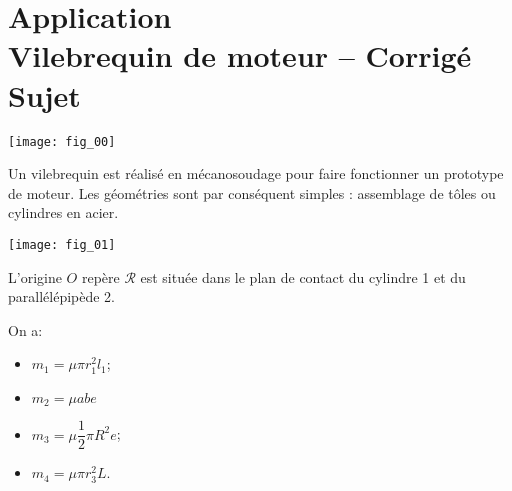 \chapter*{Application  \\ 
Vilebrequin de moteur -- \ifprof Corrigé \else Sujet \fi}

\iflivret {} \else
\ifprof  {} \else \fi
\fi



\setcounter{question}{0}
\begin{marginfigure}
\texttt{[image: fig\_00]}
\end{marginfigure}

\ifprof
\else
Un vilebrequin est réalisé en mécanosoudage pour faire fonctionner un prototype de moteur. Les géométries sont par conséquent simples : assemblage de tôles ou cylindres en acier.


\begin{center}
\texttt{[image: fig\_01]}
\end{center}
L'origine $O$ repère $\mathcal{R}$ est située dans le plan de contact du cylindre 1 et du parallélépipède 2.

\fi



\ifprof \begin{corrige}
On a: 
\begin{itemize}
\item $m_1 = \mu \pi r_1^2 l_1$;
\item $m_2 = \mu a b e$
\item $m_3 = \mu \dfrac{1}{2}\pi R^2 e$;
\item $m_4 = \mu \pi r_3^2L$.
\end{itemize}
\end{corrige}
\else
\fi


